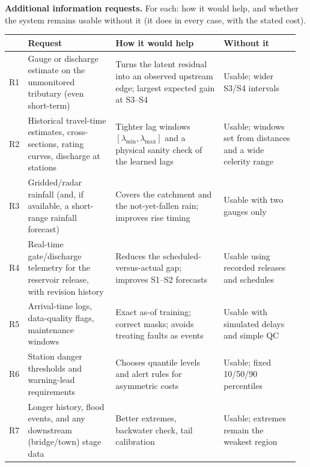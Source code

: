 \bigskip
\noindent\textbf{Additional information requests.} For each: how it would help, and whether the system remains usable without it (it does in every case, with the stated cost).
\begin{longtable}{@{}p{0.03\linewidth}p{0.30\linewidth}p{0.37\linewidth}p{0.26\linewidth}@{}}
\toprule
 & \textbf{Request} & \textbf{How it would help} & \textbf{Without it}\\ \midrule\endhead
R1 & Gauge or discharge estimate on the unmonitored tributary (even short-term) & Turns the latent residual into an observed upstream edge; largest expected gain at S3--S4 & Usable; wider S3/S4 intervals\\
R2 & Historical travel-time estimates, cross-sections, rating curves, discharge at stations & Tighter lag windows $[\lambda_{\min},\lambda_{\max}]$ and a physical sanity check of the learned lags & Usable; windows set from distances and a wide celerity range\\
R3 & Gridded/radar rainfall (and, if available, a short-range rainfall forecast) & Covers the catchment and the not-yet-fallen rain; improves rise timing & Usable with two gauges only\\
R4 & Real-time gate/discharge telemetry for the reservoir release, with revision history & Reduces the scheduled-versus-actual gap; improves S1--S2 forecasts & Usable using recorded releases and schedules\\
R5 & Arrival-time logs, data-quality flags, maintenance windows & Exact as-of training; correct masks; avoids treating faults as events & Usable with simulated delays and simple QC\\
R6 & Station danger thresholds and warning-lead requirements & Chooses quantile levels and alert rules for asymmetric costs & Usable; fixed 10/50/90 percentiles\\
R7 & Longer history, flood events, and any downstream (bridge/town) stage data & Better extremes, backwater check, tail calibration & Usable; extremes remain the weakest region\\
\bottomrule
\end{longtable}
\normalsize
